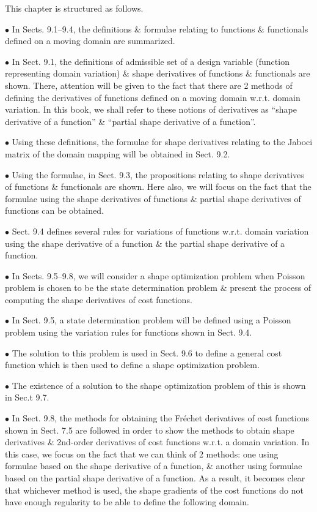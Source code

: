 \documentclass[oneside]{book}
\numberwithin{equation}{section}
\begin{document}
This chapter is structured as follows.
\begin{enumerate*}
	\item[$\bullet$] In Sects. 9.1--9.4, the definitions \& formulae relating to functions \& functionals defined on a moving domain are summarized.
	\item[$\bullet$] In Sect. 9.1, the definitions of admissible set of a design variable (function representing domain variation) \& shape derivatives of functions \& functionals are shown. There, attention will be given to the fact that there are 2 methods of defining the derivatives of functions defined on a moving domain w.r.t. domain variation. In this book, we shall refer to these notions of derivatives as ``shape derivative of a function'' \& ``partial shape derivative of a function''.
	\item[$\bullet$] Using these definitions, the formulae for shape derivatives relating to the Jaboci matrix of the domain mapping will be obtained in Sect. 9.2.
	\item[$\bullet$] Using the formulae, in Sect. 9.3, the propositions relating to shape derivatives of functions \& functionals are shown. Here also, we will focus on the fact that the formulae using the shape derivatives of functions \& partial shape derivatives of functions can be obtained.
	\item[$\bullet$] Sect. 9.4 defines several rules for variations of functions w.r.t. domain variation using the shape derivative of a function \& the partial shape derivative of a function.
	\item[$\bullet$] In Sects. 9.5--9.8, we will consider a shape optimization problem when Poisson problem is chosen to be the state determination problem \& present the process of computing the shape derivatives of cost functions.
	\item[$\bullet$] In Sect. 9.5, a state determination problem will be defined using a Poisson problem using the variation rules for functions shown in Sect. 9.4.
	\item[$\bullet$] The solution to this problem is used in Sect. 9.6 to define a general cost function which is then used to define a shape optimization problem.
	\item[$\bullet$] The existence of a solution to the shape optimization problem of this is shown in Sec.t 9.7.
	\item[$\bullet$] In Sect. 9.8, the methods for obtaining the Fr\'echet derivatives of cost functions shown in Sect. 7.5 are followed in order to show the methods to obtain shape derivatives \& 2nd-order derivatives of cost functions w.r.t. a domain variation. In this case, we focus on the fact that we can think of 2 methods: one using formulae based on the shape derivative of a function, \& another using formulae based on the partial shape derivative of a function. As a result, it becomes clear that whichever method is used, the shape gradients of the cost functions do not have enough regularity to be able to define the following domain.
	

\end{enumerate*}
\end{document}
